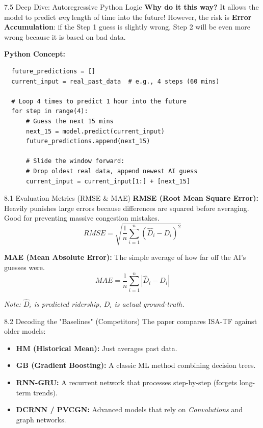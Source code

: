 \documentclass[aspectratio=169]{beamer}
\begin{document}
\begin{frame}[fragile]{7.5 Deep Dive: Autoregressive Python Logic}
  \textbf{Why do it this way?}
  It allows the model to predict \textit{any} length of time into the future! However, the risk is \textbf{Error Accumulation}: if the Step 1 guess is slightly wrong, Step 2 will be even more wrong because it is based on bad data.

  \vspace{0.2cm}
  \textbf{Python Concept:}
  \begin{verbatim}
  future_predictions = []
  current_input = real_past_data  # e.g., 4 steps (60 mins)

  # Loop 4 times to predict 1 hour into the future
  for step in range(4):
      # Guess the next 15 mins
      next_15 = model.predict(current_input)
      future_predictions.append(next_15)

      # Slide the window forward: 
      # Drop oldest real data, append newest AI guess
      current_input = current_input[1:] + [next_15]
  \end{verbatim}
\end{frame}


\begin{frame}{8.1 Evaluation Metrics (RMSE \& MAE)}
    \textbf{RMSE (Root Mean Square Error):}
    Heavily punishes large errors because differences are squared before averaging. Good for preventing massive congestion mistakes.
    $$RMSE=\sqrt{\frac{1}{n}\sum_{i=1}^{n}(\hat{D}_{i}-D_{i})^{2}}$$ 

    \textbf{MAE (Mean Absolute Error):}
    The simple average of how far off the AI's guesses were.
    $$MAE=\frac{1}{n}\sum_{i=1}^{n}|\hat{D}_{i}-D_{i}|$$ 
    
    \textit{Note: $\hat{D}_{i}$ is predicted ridership, $D_{i}$ is actual ground-truth.}
\end{frame}

\begin{frame}{8.2 Decoding the "Baselines" (Competitors)}
    The paper compares ISA-TF against older models:
    \begin{itemize}
        \item \textbf{HM (Historical Mean):} Just averages past data.
        \item \textbf{GB (Gradient Boosting):} A classic ML method combining decision trees.
        \item \textbf{RNN-GRU:} A recurrent network that processes step-by-step (forgets long-term trends).
        \item \textbf{DCRNN / PVCGN:} Advanced models that rely on \textit{Convolutions} and graph networks.
    \end{itemize}
\end{frame}
\end{document}

